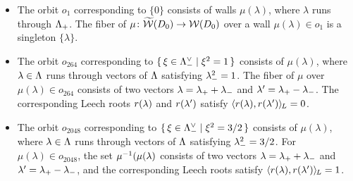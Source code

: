 \documentclass{amsart} %
\begin{document}
\begin{itemize}
\item[($1$)]
The orbit $o_1$ corresponding to $\{0\}$
consists of walls $\mu(\lambda)$,
where $\lambda$ runs through $\Lambda_{+}$.
The fiber of $\mu\colon \widetilde{\mathord{\mathcal{W}}}(D_0)\to\mathord{\mathcal{W}}(D_0)$ 
over a wall $\mu(\lambda)\in o_1$ is a singleton $\{\lambda\}$.
%
\item[($264$)]
The orbit $o_{264}$ corresponding to $\{\,{\xi\in \Lambda_{-}^{\vee}}\mid {\xi^2=1} \,\}$
consists of $\mu(\lambda)$,
where $\lambda\in \Lambda$ runs through
vectors of $\Lambda$ satisfying ${\lambda}_{-}^2=1$.
The fiber of $\mu$ 
over $\mu(\lambda)\in o_{264}$ consists 
of two vectors
$\lambda={\lambda}_{+}+{\lambda}_{-}$ and $\lambda^{\prime}={\lambda}_{+}-{\lambda}_{-}$.
The corresponding Leech roots 
$r(\lambda)$ and $r(\lambda^{\prime})$ satisfy
$\langle r(\lambda), r(\lambda^{\prime}) \rangle_{\hskip -1pt L}=0$.
%
\item[($2048$)]
The orbit $o_{2048}$ corresponding to $\{\,{\xi\in \Lambda_{-}^{\vee}}\mid {\xi^2=3/2} \,\}$
consists of $\mu(\lambda)$,
where $\lambda\in \Lambda$ runs through
vectors of $\Lambda$ satisfying ${\lambda}_{-}^2=3/2$.
For $\mu(\lambda)\in o_{2048}$, the set
 $\mu^{-1}(\mu(\lambda)$ consists 
of two vectors
$\lambda={\lambda}_{+}+{\lambda}_{-}$ and $\lambda^{\prime}={\lambda}_{+}-{\lambda}_{-}$, and 
the corresponding Leech roots 
 satisfy
$\langle r(\lambda), r(\lambda^{\prime}) \rangle_{\hskip -1pt L}=1$.

\end{itemize}
%
\end{document}
